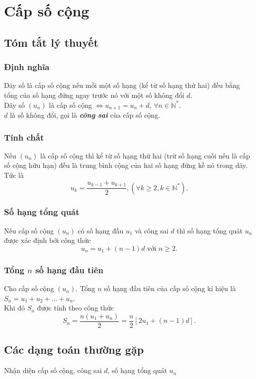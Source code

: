 \def\tenchude{CẤP SỐ CỘNG}
\setcounter{section}{5}
\setcounter{dang}{0}
\setcounter{ex}{0}
\setcounter{bt}{0}
\setcounter{vd}{0}
\section{Cấp số cộng}
\subsection{Tóm tắt lý thuyết}
\begin{tomtat}
	\subsubsection{Định nghĩa}
	Dãy số là cấp số cộng nếu mỗi một số hạng (kể từ số hạng thứ hai) đều bằng tổng của số hạng đứng ngay trước nó với một số không đổi $ d $.\\
	Dãy số $ (u_n) $ là cấp số cộng $ \Leftrightarrow u_{n+1}=u_n+d $, $ \forall n \in \mathbb{N}^* $.\\
	$ d $ là số không đổi, gọi là \textbf{\textit{công sai}} của cấp số cộng.
	\subsubsection{Tính chất}
	Nếu $ (u_n) $ là cấp số cộng thì kể từ số hạng thứ hai (trừ số hạng cuối nếu là cấp số cộng hữu hạn) đều là trung bình cộng của hai số hạng đứng kề nó trong dãy. Tức là $$u_k=\dfrac{u_{k-1}+u_{k+1}}{2}, (\forall k\ge 2, k \in \mathbb{N}^*).$$
	\subsubsection{Số hạng tổng quát}
	Nếu cấp số cộng $ (u_n) $ có số hạng đầu $ u_1 $ và công sai $ d $ thì số hạng tổng quát $ u_n $ được xác định bởi công thức $$u_n=u_1+(n-1)d \text{ với $n\ge 2$}.$$
	\subsubsection{Tổng $ n $ số hạng đầu tiên}
	Cho cấp số cộng $ (u_n) $. Tổng $ n $ số hạng đầu tiên của cấp số cộng kí hiệu là $ S_n=u_1+u_2+\ldots+u_n $.\\
	Khi đó $ S_n $ được tính theo công thức $$ S_n=\dfrac{n(u_1+u_n)}{2}=\dfrac{n}{2}\left[ 2u_1+(n-1)d\right]. $$
\end{tomtat}
\subsection{Các dạng toán thường gặp}
\begin{dang}{Nhận diện cấp số cộng, công sai $ d $, số hạng tổng quát $ u_n $}
\end{dang}
